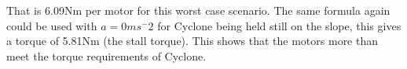 That is 6.09Nm per motor for this worst case scenario. The same formula again could be used with $a=0ms^-2$ for Cyclone being held still on the slope, this gives a torque of 5.81Nm (the stall torque). This shows that the motors more than meet the torque requirements of Cyclone.\par

